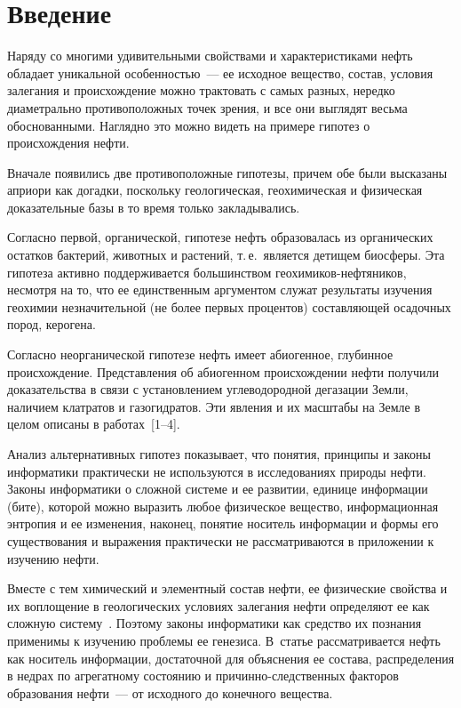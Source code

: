       \begin{multicols}{2}

      \label{st\stat}
     
     \section{Введение}
     
     Наряду со многими удивительными свойствами и характеристиками нефть 
обладает уникальной особенностью~--- ее исходное вещество, состав, условия 
залегания и происхождение можно трактовать с самых разных, нередко 
диаметрально противоположных точек зрения, и все они выглядят весьма 
обоснованными. Наглядно это можно видеть на примере гипотез о происхождения 
нефти.
     
     Вначале появились две противоположные гипотезы, причем обе были 
высказаны априори как догадки, поскольку геологическая, геохимическая и 
физическая доказательные базы в то время только закладывались. 
     
     Согласно первой, органической, гипотезе нефть образовалась из органических 
остатков бактерий, животных и растений, т.\,е.\ является детищем биосферы. Эта 
гипотеза активно поддерживается большинством геохимиков-нефтяников, 
несмотря на то, что ее единственным аргументом служат результаты изучения 
геохимии незначительной (не более первых процентов) составляющей осадочных 
пород, керогена. 
     
     Согласно неорганической гипотезе нефть имеет абиогенное, глубинное 
происхождение. Пред\-став\-ле\-ния об абиогенном происхождении нефти получили 
доказательства в связи с установлением углеводородной дегазации Земли, 
наличием клатратов и газогидратов. Эти явления и их масштабы на Земле в целом 
описаны в работах~[1--4].
     
     Анализ альтернативных гипотез показывает, что понятия, принципы и законы 
информатики практически не используются в исследованиях природы нефти. 
Законы информатики о сложной системе и ее развитии, единице информации (бите), 
которой можно выразить любое физическое вещество, информационная энтропия и 
ее изменения, наконец, понятие носитель информации и формы его существования 
и выражения практически не рассматриваются в приложении к изучению нефти. 
     
     Вместе с тем химический и элементный состав нефти, ее физические свойства 
и их воплощение в геологических условиях залегания нефти определяют ее как 
сложную систему~\cite{21s}. Поэтому законы информатики как средство их 
познания применимы к изучению проблемы ее генезиса. В~статье рас\-смат\-ри\-ва\-ет\-ся 
нефть как носитель информации, достаточной для объяснения ее состава, 
распределения в недрах по агрегатному состоянию и причинно-следственных 
факторов образования нефти~--- от исходного до конечного вещества.


\end{multicols}
